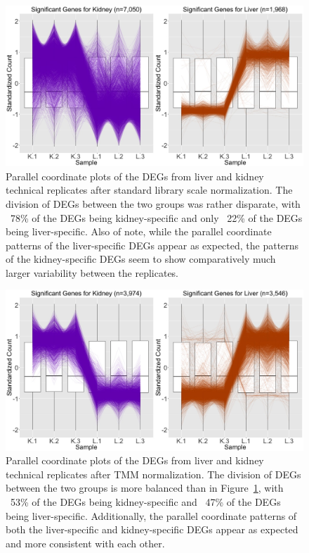 \documentclass{article}
\begin{document}
\clearpage
\null
\begin{figure}[t!]
\centerline{\includegraphics[width=1\columnwidth]{../Bioinformatics/Pictures/liverKidney/Clustering_data_FDR_001_Raw/Alpha0.1/K_L_Sig.jpg}}
\caption{Parallel coordinate plots of the DEGs from liver and kidney technical replicates after standard library scale normalization. The division of DEGs between the two groups was rather disparate, with ~78\% of the DEGs being kidney-specific and only ~22\% of the DEGs being liver-specific. Also of note, while the parallel coordinate patterns of the liver-specific DEGs appear as expected, the patterns of the kidney-specific DEGs seem to show comparatively much larger variability between the replicates.
\label{RawKLSig}}
\end{figure}   

\clearpage
\null
\begin{figure}[t!]
\centerline{\includegraphics[width=1\columnwidth]{../Bioinformatics/Pictures/liverKidney/Clustering_data_FDR_001_TMM/Alpha0.1/K_L_Sig.jpg}}
\caption{Parallel coordinate plots of the DEGs from liver and kidney technical replicates after TMM normalization. The division of DEGs between the two groups is more balanced than in Figure~\ref{RawKLSig}, with ~53\% of the DEGs being kidney-specific and ~47\% of the DEGs being liver-specific. Additionally, the parallel coordinate patterns of both the liver-specific and kidney-specific DEGs appear as expected and more consistent with each other.
\label{TMMKLSig}}
\end{figure} 
\end{document}
